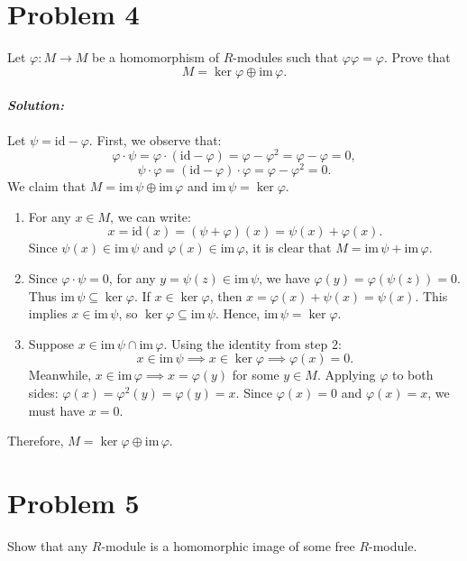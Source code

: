 \documentclass[12pt, a4paper]{article}
\newenvironment{solution}
  {\paragraph{\textit{Solution:}}\par\medskip}
  {\vspace{0.1cm}}
\begin{document}
\section*{Problem 4}
Let $\varphi : M \to M$ be a homomorphism of $R$-modules such that $\varphi\varphi = \varphi$. Prove that
\[ M = \ker \varphi \oplus \text{im}\,\varphi. \]

\begin{solution}
Let $\psi = \text{id} - \varphi$. First, we observe that:
\[ \varphi \cdot \psi = \varphi \cdot (\text{id} - \varphi) = \varphi - \varphi^2 = \varphi - \varphi = 0, \]
\[ \psi \cdot \varphi = (\text{id} - \varphi) \cdot \varphi = \varphi - \varphi^2 = 0. \]
We claim that $M = \text{im} \, \psi \oplus \text{im} \, \varphi$ and $\text{im} \, \psi = \ker \varphi$.

\begin{enumerate}
    \item 
    For any $x \in M$, we can write:
    \[ x = \text{id}(x) = (\psi + \varphi)(x) = \psi(x) + \varphi(x). \]
    Since $\psi(x) \in \text{im} \, \psi$ and $\varphi(x) \in \text{im} \, \varphi$, it is clear that $M = \text{im} \, \psi + \text{im} \, \varphi$.

    \item 
     Since $\varphi \cdot \psi = 0$, for any $y = \psi(z) \in \text{im} \, \psi$, we have $\varphi(y) = \varphi(\psi(z)) = 0$. Thus $\text{im} \, \psi \subseteq \ker \varphi$.
     If $x \in \ker \varphi$, then $x =\varphi(x)+ \psi(x)= \psi(x)$. 
        This implies $x \in \text{im} \, \psi$, so $\ker \varphi \subseteq \text{im} \, \psi$.
    Hence, $\text{im} \, \psi = \ker \varphi$.

    \item 
    Suppose $x \in \text{im} \, \psi \cap \text{im} \, \varphi$. Using the identity from step 2:
    \[ x \in \text{im} \, \psi \implies x \in \ker \varphi \implies \varphi(x) = 0. \]
    Meanwhile, $x \in \text{im} \, \varphi \implies x = \varphi(y)$ for some $y \in M$. 
    Applying $\varphi$ to both sides: $\varphi(x) = \varphi^2(y) = \varphi(y) = x$.
    Since $\varphi(x) = 0$ and $\varphi(x) = x$, we must have $x = 0$.
\end{enumerate}
Therefore, $M = \ker \varphi \oplus \text{im} \, \varphi$.
\end{solution}

\section*{Problem 5}
Show that any $R$-module is a homomorphic image of some free $R$-module.
\end{document}
